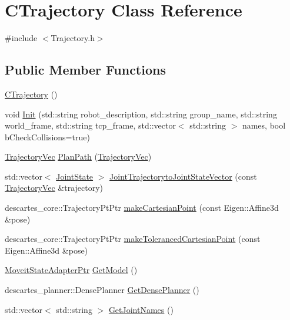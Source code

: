 \hypertarget{classCTrajectory}{\section{C\-Trajectory Class Reference}
\label{classCTrajectory}
}


{\ttfamily \#include $<$Trajectory.\-h$>$}

\subsection*{Public Member Functions}
\begin{DoxyCompactItemize}
\item 
\hyperlink{classCTrajectory_ad9592b2125107295b760eca869b30b41}{C\-Trajectory} ()
\item 
void \hyperlink{classCTrajectory_ac92b596fa313de9347d32ff9ea058fb6}{Init} (std\-::string robot\-\_\-description, std\-::string group\-\_\-name, std\-::string world\-\_\-frame, std\-::string tcp\-\_\-frame, std\-::vector$<$ std\-::string $>$ names, bool b\-Check\-Collisions=true)
\item 
\hyperlink{demo_8cpp_a2a09344c15175b0b6ea4da8bbffa8106}{Trajectory\-Vec} \hyperlink{classCTrajectory_a8b83ae5cfb16e5546924b2f75cc1c5d3}{Plan\-Path} (\hyperlink{demo_8cpp_a2a09344c15175b0b6ea4da8bbffa8106}{Trajectory\-Vec})
\item 
std\-::vector$<$ \hyperlink{RCS_8h_aa4adb93a26caa4dacba9c9614e283245}{Joint\-State} $>$ \hyperlink{classCTrajectory_a4309ad54e4e51e38477a834a8e791070}{Joint\-Trajectoryto\-Joint\-State\-Vector} (const \hyperlink{demo_8cpp_a2a09344c15175b0b6ea4da8bbffa8106}{Trajectory\-Vec} \&trajectory)
\item 
descartes\-\_\-core\-::\-Trajectory\-Pt\-Ptr \hyperlink{classCTrajectory_a30c8c7a6759edac702b92cb54421aa68}{make\-Cartesian\-Point} (const Eigen\-::\-Affine3d \&pose)
\item 
descartes\-\_\-core\-::\-Trajectory\-Pt\-Ptr \hyperlink{classCTrajectory_a670350241341dced932c2cabc924eb35}{make\-Toleranced\-Cartesian\-Point} (const Eigen\-::\-Affine3d \&pose)
\item 
\hyperlink{Trajectory_8h_a5e61c6eea593862de00adc245142f8c9}{Moveit\-State\-Adapter\-Ptr} \hyperlink{classCTrajectory_af25f07706a8f67bb49e0f9c46be14235}{Get\-Model} ()
\item 
descartes\-\_\-planner\-::\-Dense\-Planner \hyperlink{classCTrajectory_a7b097ba0b076f6de862b51098bdfa8b6}{Get\-Dense\-Planner} ()
\item 
std\-::vector$<$ std\-::string $>$ \hyperlink{classCTrajectory_aa76f10ca67ac1fc7215b15b92e4226a2}{Get\-Joint\-Names} ()
\end{DoxyCompactItemize}

